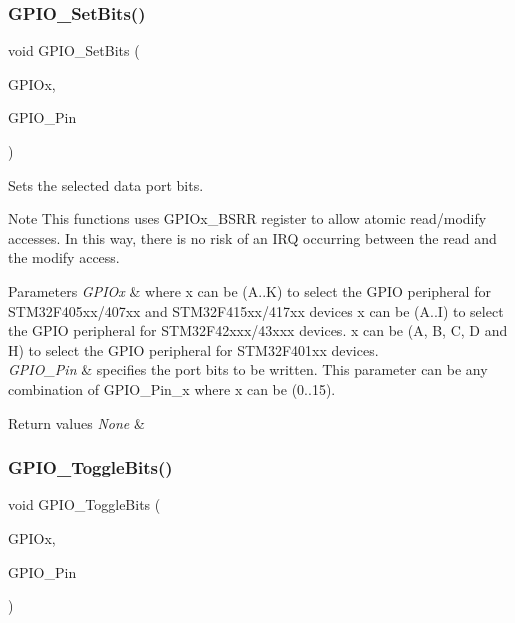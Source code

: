 \subsubsection{\texorpdfstring{G\+P\+I\+O\+\_\+\+Set\+Bits()}{GPIO\_SetBits()}}
{\footnotesize\ttfamily void G\+P\+I\+O\+\_\+\+Set\+Bits (\begin{DoxyParamCaption}\item[{G\+P\+I\+O\+\_\+\+Type\+Def $\ast$}]{G\+P\+I\+Ox,  }\item[{uint16\+\_\+t}]{G\+P\+I\+O\+\_\+\+Pin }\end{DoxyParamCaption})}



Sets the selected data port bits. 

\begin{DoxyNote}{Note}
This functions uses G\+P\+I\+Ox\+\_\+\+B\+S\+RR register to allow atomic read/modify accesses. In this way, there is no risk of an I\+RQ occurring between the read and the modify access. 
\end{DoxyNote}

\begin{DoxyParams}{Parameters}
{\em G\+P\+I\+Ox} & where x can be (A..K) to select the G\+P\+IO peripheral for S\+T\+M32\+F405xx/407xx and S\+T\+M32\+F415xx/417xx devices x can be (A..I) to select the G\+P\+IO peripheral for S\+T\+M32\+F42xxx/43xxx devices. x can be (A, B, C, D and H) to select the G\+P\+IO peripheral for S\+T\+M32\+F401xx devices. \\
\hline
{\em G\+P\+I\+O\+\_\+\+Pin} & specifies the port bits to be written. This parameter can be any combination of G\+P\+I\+O\+\_\+\+Pin\+\_\+x where x can be (0..15). \\
\hline
\end{DoxyParams}

\begin{DoxyRetVals}{Return values}
{\em None} & \\
\hline
\end{DoxyRetVals}
\mbox{\label{group___g_p_i_o___group2_gac1b837c66258872740d5f89f23549ab1}} 
\subsubsection{\texorpdfstring{G\+P\+I\+O\+\_\+\+Toggle\+Bits()}{GPIO\_ToggleBits()}}
{\footnotesize\ttfamily void G\+P\+I\+O\+\_\+\+Toggle\+Bits (\begin{DoxyParamCaption}\item[{G\+P\+I\+O\+\_\+\+Type\+Def $\ast$}]{G\+P\+I\+Ox,  }\item[{uint16\+\_\+t}]{G\+P\+I\+O\+\_\+\+Pin }\end{DoxyParamCaption})}



